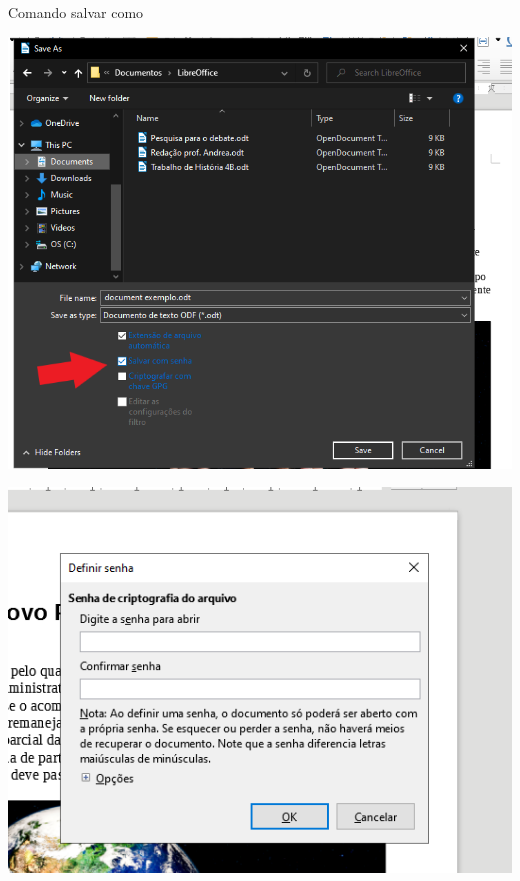 \begin{frame}{Comando salvar como}

	\begin{minipage}{0.49\linewidth}
		\centering
		\includegraphics[width=1\linewidth]{Figuras/Ch04/fig35}
	\end{minipage}\hfill
	\begin{minipage}{0.49\linewidth}
		\centering
		\includegraphics[width=1\linewidth]{Figuras/Ch04/fig36}
	\end{minipage}
\end{frame}


